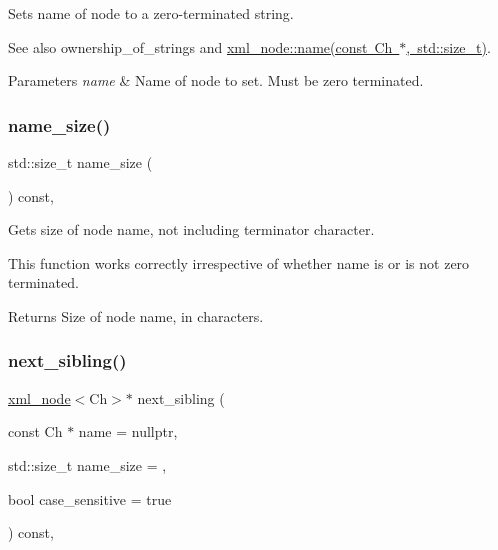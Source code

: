 Sets name of node to a zero-\/terminated string. 

See also ownership\+\_\+of\+\_\+strings and \mbox{\hyperlink{classrapidxml_1_1xml__base_a4e7e23d06d48126c65b1f6266acfba5c}{xml\+\_\+node\+::name(const Ch $\ast$, std\+::size\+\_\+t)}}. 
\begin{DoxyParams}{Parameters}
{\em name} & Name of node to set. Must be zero terminated. \\
\hline
\end{DoxyParams}
\mbox{\label{classrapidxml_1_1xml__base_ad01e2eff02202b130baad012d1ed7328}} 
\subsubsection{\texorpdfstring{name\+\_\+size()}{name\_size()}}
{\footnotesize\ttfamily std\+::size\+\_\+t name\+\_\+size (\begin{DoxyParamCaption}{ }\end{DoxyParamCaption}) const\hspace{0.3cm}{\ttfamily [inline]}, {\ttfamily [inherited]}}



Gets size of node name, not including terminator character. 

This function works correctly irrespective of whether name is or is not zero terminated. \begin{DoxyReturn}{Returns}
Size of node name, in characters. 
\end{DoxyReturn}
\mbox{\label{classrapidxml_1_1xml__node_a365211719a7337837a502699275c5db6}} 
\subsubsection{\texorpdfstring{next\+\_\+sibling()}{next\_sibling()}}
{\footnotesize\ttfamily \mbox{\hyperlink{classrapidxml_1_1xml__node}{xml\+\_\+node}}$<$Ch$>$$\ast$ next\+\_\+sibling (\begin{DoxyParamCaption}\item[{const Ch $\ast$}]{name = {\ttfamily nullptr},  }\item[{std\+::size\+\_\+t}]{name\+\_\+size = {},  }\item[{bool}]{case\+\_\+sensitive = {\ttfamily true} }\end{DoxyParamCaption}) const\hspace{0.3cm}{\ttfamily [inline]}, {\ttfamily [inherited]}}




